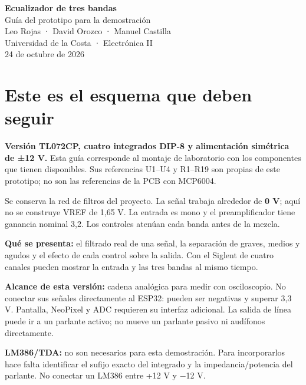 \documentclass[10pt,a4paper]{article}
\begin{document}
\begin{center}{\LARGE\bfseries Ecualizador de tres bandas}\\[3mm]{\Large Guía del prototipo para la demostración}\\[4mm]Leo Rojas · David Orozco · Manuel Castilla\\Universidad de la Costa · Electrónica II\\24 de octubre de 2026\end{center}
\section{Este es el esquema que deben seguir}
\textbf{Versión TL072CP, cuatro integrados DIP-8 y alimentación simétrica de ±12 V.} Esta guía corresponde al montaje de laboratorio con los componentes que tienen disponibles. Sus referencias U1--U4 y R1--R19 son propias de este prototipo; no son las referencias de la PCB con MCP6004.

Se conserva la red de filtros del proyecto. La señal trabaja alrededor de \textbf{0 V}; aquí no se construye VREF de 1,65 V. La entrada es mono y el preamplificador tiene ganancia nominal 3,2. Los controles atenúan cada banda antes de la mezcla.

\begin{center}\end{center}

\textbf{Qué se presenta:} el filtrado real de una señal, la separación de graves, medios y agudos y el efecto de cada control sobre la salida. Con el Siglent de cuatro canales pueden mostrar la entrada y las tres bandas al mismo tiempo.

\textbf{Alcance de esta versión:} cadena analógica para medir con osciloscopio. No conectar sus señales directamente al ESP32: pueden ser negativas y superar 3,3 V. Pantalla, NeoPixel y ADC requieren su interfaz adicional. La salida de línea puede ir a un parlante activo; no mueve un parlante pasivo ni audífonos directamente.

\textbf{LM386/TDA:} no son necesarios para esta demostración. Para incorporarlos hace falta identificar el sufijo exacto del integrado y la impedancia/potencia del parlante. No conectar un LM386 entre +12 V y −12 V.
\end{document}
